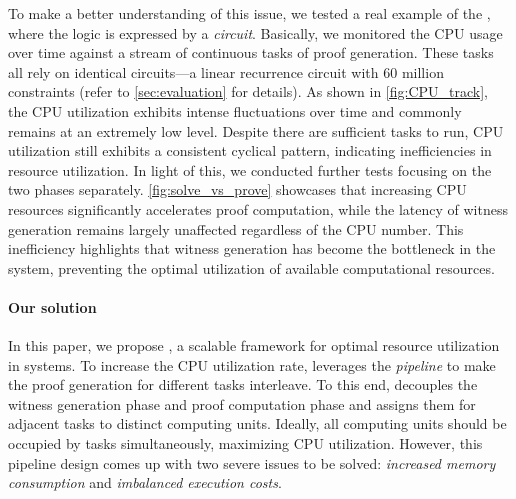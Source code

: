 To make a better understanding of this issue, we tested a real example of the \zk, where the logic is expressed by a \emph{circuit}. Basically, we monitored the CPU usage over time against a stream of continuous tasks of proof generation. 
These tasks all rely on identical circuits—a linear recurrence circuit with 60 million constraints (refer to \cref{sec:evaluation} for details). As shown in \cref{fig:CPU_track}, the CPU utilization 
exhibits intense fluctuations over time
and commonly remains at an extremely low level. Despite there are sufficient tasks to run,  CPU utilization still exhibits a consistent cyclical pattern, indicating inefficiencies in resource utilization. 
In light of this, we conducted further tests focusing on the two phases separately.  \cref{fig:solve_vs_prove} showcases that increasing CPU resources significantly accelerates proof computation, while the latency of witness generation remains largely unaffected regardless of the CPU number. This inefficiency highlights that witness generation has become the bottleneck in the {\zk} system, preventing the optimal utilization of available computational resources.








\paragraph{Our solution} In this paper, we propose \system, a scalable framework for optimal resource utilization in \zk systems.
To increase the CPU utilization rate, \system leverages the \emph{pipeline} to make the proof generation for different tasks interleave. To this end, \system decouples the witness generation phase and proof computation phase and assigns them for adjacent tasks to distinct computing units. Ideally, all computing units should be occupied by tasks simultaneously, maximizing CPU utilization. However, this pipeline design comes up with two severe issues to be solved: \emph{increased memory consumption} and \emph{imbalanced execution costs}.  

